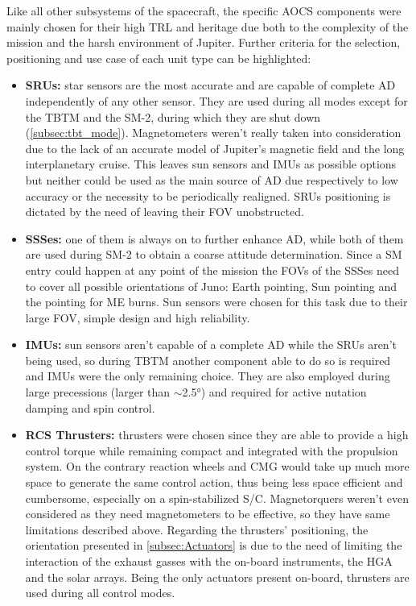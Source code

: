 Like all other subsystems of the spacecraft, the specific AOCS components were mainly chosen for their high TRL and heritage due both to the complexity of the mission and the harsh environment of Jupiter. Further criteria for the selection, positioning and use case of each unit type can be highlighted:
\begin{itemize}
    \item \textbf{SRUs:} star sensors are the most accurate and are capable of complete AD independently of any other sensor. They are used during all modes except for the TBTM and the SM-2, during which they are shut down (\autoref{subsec:tbt_mode}). Magnetometers weren't really taken into consideration due to the lack of an accurate model of Jupiter's magnetic field and the long interplanetary cruise. This leaves sun sensors and IMUs as possible options but neither could be used as the main source of AD due respectively to low accuracy or the necessity to be periodically realigned. SRUs positioning is dictated by the need of leaving their FOV unobstructed.
    \item \textbf{SSSes:} one of them is always on to further enhance AD, while both of them are used during SM-2 to obtain a coarse attitude determination. Since a SM entry could happen at any point of the mission the FOVs of the SSSes need to cover all possible orientations of Juno: Earth pointing, Sun pointing and the pointing for ME burns. Sun sensors were chosen for this task due to their large FOV, simple design and high reliability.
    \item \textbf{IMUs:} sun sensors aren't capable of a complete AD while the SRUs aren't being used, so during TBTM another component able to do so is required and IMUs were the only remaining choice. They are also employed during large precessions (larger than $\sim$2.5°) and required for active nutation damping and spin control. \cite{juno_sito}
    \item \textbf{RCS Thrusters:} thrusters were chosen since they are able to provide a high control torque while remaining compact and integrated with the propulsion system. On the contrary reaction wheels and CMG would take up much more space to generate the same control action, thus being less space efficient and cumbersome, especially on a spin-stabilized S/C. Magnetorquers weren't even considered as they need magnetometers to be effective, so they have same limitations described above. Regarding the thrusters' positioning, the orientation presented in \autoref{subsec:Actuators} is due to the need of limiting the interaction of the exhaust gasses with the on-board instruments, the HGA and the solar arrays. Being the only actuators present on-board, thrusters are used during all control modes.
\end{itemize}  
